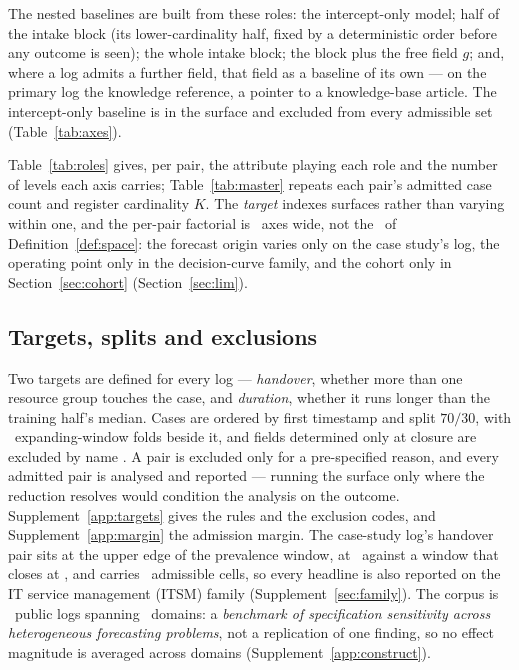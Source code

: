 The nested baselines are built from these roles: the intercept-only model;
half of the intake block (its lower-cardinality half, fixed by a
deterministic order before any outcome is seen); the whole intake block; the
block plus the free field $g$; and, where a log admits a further field, that
field as a baseline of its own --- on the primary log the knowledge
reference, a pointer to a knowledge-base article. The intercept-only baseline
is in the surface and excluded from every admissible set
(Table~\ref{tab:axes}).

Table~\ref{tab:roles} gives, per pair, the attribute playing each role and the
number of levels each axis carries; Table~\ref{tab:master} repeats each
pair's admitted case count and register cardinality $K$. The \emph{target}
indexes surfaces rather than varying within one, and the per-pair factorial
is \nPerPairAxes\ axes wide, not the \nAxes\ of Definition~\ref{def:space}:
the forecast origin varies only on the case study's log, the operating point
only in the decision-curve family, and the cohort only in
Section~\ref{sec:cohort} (Section~\ref{sec:lim}).

\subsection{Targets, splits and exclusions}
\label{sec:targets}

Two targets are defined for every log --- \emph{handover}, whether more than
one resource group touches the case, and \emph{duration}, whether it runs
longer than the training half's median. Cases are ordered by first timestamp
and split $70/30$, with \nFolds\ expanding-window folds beside it, and fields
determined only at closure are excluded by name
\citep{kaufman2012leakage,kapoor2023leakage,weytjens2022leakage}. A pair is
excluded only for a pre-specified reason, and every admitted pair is
analysed and reported --- running the surface only where the reduction
resolves would condition the analysis on the outcome.
Supplement~\ref{app:targets} gives the rules and the exclusion codes, and
Supplement~\ref{app:margin} the admission margin. The case-study log's
handover pair sits at the upper edge of the prevalence window, at
\prevAdmittedMax\ against a window that closes at \prevHi, and carries
\nCellsBpicFourteenHandover\ admissible cells, so every headline is also
reported on the IT service management (ITSM) family
(Supplement~\ref{sec:family}). The corpus is \nLogs\ public logs spanning
\nDomains\ domains: a \emph{benchmark of specification sensitivity across
heterogeneous forecasting problems}, not a replication of one finding, so no
effect magnitude is averaged across domains
(Supplement~\ref{app:construct}).
